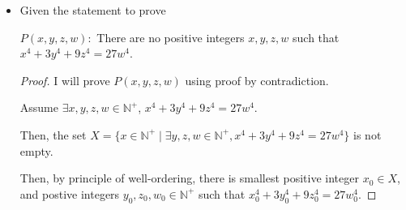 \documentclass[12pt]{article}
\begin{document}
\begin{itemize}
    \item

    Given the statement to prove

    \begin{center}
        $P(x,y,z,w):$ There are no positive integers $x,y,z,w$ such that $x^4 + 3y^4 + 9z^4 = 27w^4$.
    \end{center}

    \bigskip

    \begin{proof}
    I will prove $P(x,y,z,w)$ using proof by contradiction.

    \bigskip

    Assume $\exists x,y,z,w \in \mathbb{N}^+$, $x^4 + 3y^4 + 9z^4 = 27w^4$.

    \bigskip

    Then, the set $X = \{x \in \mathbb{N}^+ \mid \exists y,z,w \in \mathbb{N}^+, x^4 + 3y^4 + 9z^4 = 27w^4\}$ is
    not empty.

    \bigskip

    Then, by principle of well-ordering, there is smallest positive integer
    $x_0 \in X$, and postive integers $y_0,z_0,w_0 \in \mathbb{N}^+$ such
    that $x_0^4 + 3y_0^4 + 9z_0^4 = 27w_0^4$.

    \bigskip


\end{proof}
\end{itemize}
\end{document}
